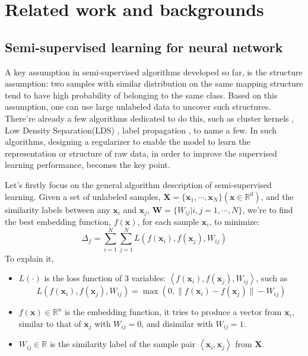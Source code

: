 \documentclass[3p,times,procedia]{elsarticle}
\begin{document}
\section{Related work and backgrounds}

\subsection{Semi-supervised learning for
neural network}
A key assumption in semi-supervised 
algorithms developed so far, is the 
structure assumption: two samples with 
similar distribution on the same mapping 
structure tend to have high probability 
of belonging to the same class. Based on 
this assumption, one can use large 
unlabeled data to uncover such 
structures. There're already a few 
algorithms dedicated to do this,
such as cluster kernels
\cite{chapelle2003cluster},
Low Density Separation(LDS)
\cite{chapelle2005semi},
label propagation
\cite{zhu2002learning},
to name a few.
In such algorithms, designing a regularizer
to enable the model to learn the representation
or structure of raw data, in order to improve
the supervised learning performance, becomes
the key point.

Let's firstly focus on the general algorithm
description of semi-supervised learning.
Given a set of unlabeled samples,
$\mathbf{X}=\{\mathbf{x}_1,\cdots,
\mathbf{x}_N\}(\mathbf{x}\in\mathbb{R}^d)$,
and the similarity labels between any
$\mathbf{x}_i$ and $\mathbf{x}_j$,
$\mathbf{W}=\{W_{ij}|i,j=1,\cdots,N\}$,
we're to find the best embedding function, 
$f(\mathbf{x})$, for each sample $\mathbf{x}_i$, 
to minimize:
\begin{equation}
\Delta_{f}=
	\sum^{N}_{i=1}
	\sum^{N}_{j=1}
	L\left(
	f(\mathbf{x}_i),
	f(\mathbf{x}_j),
	W_{ij}
	\right)
\label{eq:1}
\end{equation}
To explain it,
\begin{itemize}[]
\item $L(\cdot)$ is the loss function of 3 
variables: 
$\left<
		f(\mathbf{x}_i),
		f(\mathbf{x}_j),
		W_{ij}
		\right>$, 
such as 
		$$L\left(
		f(\mathbf{x}_i),
		f(\mathbf{x}_j),
		W_{ij}
		\right) = 
		\max\left(
		0,
		\|f(\mathbf{x}_i)-
		f(\mathbf{x}_j)
		\|-W_{ij}
		\right)$$
\item $f(\mathbf{x})\in\mathbb{R}^n$ is the 
embedding function, it tries to produce a 
vector from $\mathbf{x}_i$, similar to that 
of $\mathbf{x}_j$ with $W_{ij}=0$,
and disimilar with $W_{ij}=1$.
\item $W_{ij}\in \mathbb{R}$ is the similarity 
label of the sample pair
$\left<
		\mathbf{x}_i,
		\mathbf{x}_j
		\right>$ from $\mathbf{X}$.
\end{itemize}
\end{document}
